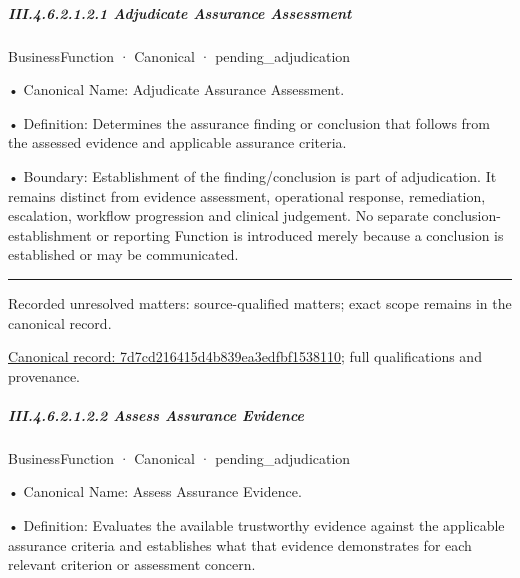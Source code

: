\subparagraph*{III.4.6.2.1.2.1 Adjudicate Assurance Assessment}
\label{navigation:III.4.6.2.1.2.1}

\label{element:7d7cd216415d4b839ea3edfbf1538110}
{\small BusinessFunction · Canonical · pending\_adjudication}\par

•
Canonical Name: Adjudicate Assurance Assessment.



•
Definition: Determines the assurance finding or conclusion that follows from the assessed evidence and applicable assurance criteria.



•
Boundary: Establishment of the finding/conclusion is part of adjudication. It remains distinct from evidence assessment, operational response, remediation, escalation, workflow progression and clinical judgement. No separate conclusion-establishment or reporting Function is introduced merely because a conclusion is established or may be communicated.



\medskip\hrule\medskip

{\small Recorded unresolved matters: source-qualified matters; exact scope remains in the canonical record.}\par
{\footnotesize \href{../../../../../../../continuum/business/business-function/7d7cd216415d4b839ea3edfbf1538110.md}{Canonical record: 7d7cd216415d4b839ea3edfbf1538110}; full qualifications and provenance.}\par
\subparagraph*{III.4.6.2.1.2.2 Assess Assurance Evidence}
\label{navigation:III.4.6.2.1.2.2}

\label{element:e1f6402d47c0455b95b45a1a4d393484}
{\small BusinessFunction · Canonical · pending\_adjudication}\par

•
Canonical Name: Assess Assurance Evidence.



•
Definition: Evaluates the available trustworthy evidence against the applicable assurance criteria and establishes what that evidence demonstrates for each relevant criterion or assessment concern.



